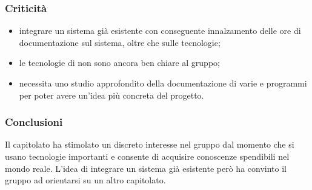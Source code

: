 		\subsubsection{Criticità}
			\begin{itemize}
				\item integrare un sistema già esistente con conseguente innalzamento delle ore di documentazione sul sistema, oltre che sulle tecnologie;
				\item le tecnologie di  non sono ancora ben chiare al gruppo;
				\item necessita uno studio approfondito della documentazione di varie  e programmi per poter avere un'idea più concreta del progetto.
			\end{itemize}

		\subsubsection{Conclusioni}
			Il capitolato ha stimolato un discreto interesse nel gruppo dal momento che si usano tecnologie importanti e consente di acquisire conoscenze spendibili nel mondo reale. L'idea di integrare un sistema già esistente però ha convinto il gruppo ad orientarsi su un altro capitolato.
